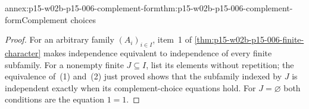 \begin{annexitem}{annex:p15-w02b-p15-006-complement-form}{thm:p15-w02b-p15-006-complement-form}{Complement choices}
\begin{proof}
For an arbitrary family \((A_i)_{i\in I}\), item~1 of
\cref{thm:p15-w02b-p15-006-finite-character} makes independence
equivalent to independence of every finite subfamily. For a nonempty
finite \(J\subseteq I\), list its elements without repetition; the
equivalence of~(1) and~(2) just proved shows that the subfamily
indexed by \(J\) is independent exactly when its complement-choice
equations hold. For \(J=\varnothing\) both conditions are the equation
\(1=1\).
\end{proof}
\end{annexitem}
